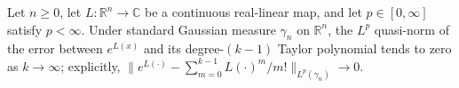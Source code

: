 \begin{lemma}
\label{BooleanAnalysis.GaussianSpace.tendsto_gaussian_exp_taylor}
\leanok
{}
Let $n\ge 0$, let $L:\mathbb R^n\to\mathbb C$ be a continuous real-linear map, and let
$p\in[0,\infty]$ satisfy $p<\infty$. Under standard Gaussian measure $\gamma_n$ on
$\mathbb R^n$, the $L^p$ quasi-norm of the error between $e^{L(x)}$ and its
degree-$(k-1)$ Taylor polynomial tends to zero as $k\to\infty$; explicitly,
$\|e^{L(\cdot)}-\sum_{m=0}^{k-1}L(\cdot)^m/m!\|_{L^p(\gamma_n)}\to0$.
\end{lemma}
